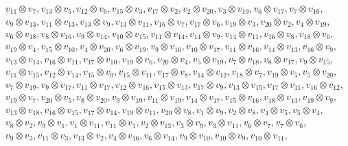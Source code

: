\documentclass[pdftex]{sigma}
\numberwithin{equation}{section}
\theoremstyle{definition}
\begin{document}
\begin{align*}
&v_{11} \otimes v_{7},
v_{13} \otimes v_{5},
v_{12} \otimes v_{6},
v_{15} \otimes v_{3},
v_{17} \otimes v_{2},
v_{2} \otimes v_{20},
v_{3} \otimes v_{19},
v_{6} \otimes v_{17},
v_{7} \otimes v_{16}, \\
&v_{9} \otimes v_{13},
v_{11} \otimes v_{13},
v_{13} \otimes v_{9},
v_{13} \otimes v_{11},
v_{16} \otimes v_{7},
v_{17} \otimes v_{6},
v_{19} \otimes v_{3},
v_{20} \otimes v_{2},
v_{4} \otimes v_{19}, \\
&v_{6} \otimes v_{18},
v_{8} \otimes v_{16},
v_{9} \otimes v_{14},
v_{10} \otimes v_{15},
v_{11} \otimes v_{14},
v_{14} \otimes v_{9},
v_{14} \otimes v_{11},
v_{16} \otimes v_{8},
v_{18} \otimes v_{6}, \\
&v_{19} \otimes v_{4},
v_{15} \otimes v_{10},
v_{4} \otimes v_{20},
v_{6} \otimes v_{19},
v_{9} \otimes v_{16},
v_{10} \otimes v_{17},
v_{11} \otimes v_{16},
v_{14} \otimes v_{13},
v_{16} \otimes v_{9}, \\
&v_{13} \otimes v_{14},
v_{16} \otimes v_{11},
v_{17} \otimes v_{10},
v_{19} \otimes v_{6},
v_{20} \otimes v_{4},
v_{5} \otimes v_{19},
v_{7} \otimes v_{18},
v_{8} \otimes v_{17},
v_{9} \otimes v_{15}, \\
&v_{11} \otimes v_{15},
v_{12} \otimes v_{14},
v_{15} \otimes v_{9},
v_{15} \otimes v_{11},
v_{17} \otimes v_{8},
v_{14} \otimes v_{12},
v_{18} \otimes v_{7},
v_{19} \otimes v_{5},
v_{5} \otimes v_{20}, \\
&v_{7} \otimes v_{19},
v_{9} \otimes v_{17},
v_{11} \otimes v_{17},
v_{12} \otimes v_{16},
v_{15} \otimes v_{13},
v_{17} \otimes v_{9},
v_{13} \otimes v_{15},
v_{17} \otimes v_{11},
v_{16} \otimes v_{12}, \\
&v_{19} \otimes v_{7},
v_{20} \otimes v_{5},
v_{8} \otimes v_{20},
v_{9} \otimes v_{19},
v_{11} \otimes v_{19},
v_{14} \otimes v_{17},
v_{15} \otimes v_{16},
v_{18} \otimes v_{13},
v_{19} \otimes v_{9}, \\
&v_{13} \otimes v_{18},
v_{16} \otimes v_{15},
v_{17} \otimes v_{14},
v_{19} \otimes v_{11},
v_{20} \otimes v_{8},
v_{1} \otimes v_{9},
v_{2} \otimes v_{8},
v_{4} \otimes v_{5},
v_{5} \otimes v_{4}, \\
&v_{8} \otimes v_{2},
v_{9} \otimes v_{1},
v_{1} \otimes v_{11},
v_{11} \otimes v_{1},
v_{2} \otimes v_{13},
v_{3} \otimes v_{9},
v_{3} \otimes v_{11},
v_{6} \otimes v_{7},
v_{7} \otimes v_{6}, \\
&v_{9} \otimes v_{3},
v_{11} \otimes v_{3},
v_{13} \otimes v_{2},
v_{4} \otimes v_{16},
v_{6} \otimes v_{14},
v_{9} \otimes v_{10},
v_{10} \otimes v_{9},
v_{10} \otimes v_{11},

\end{align*}
\end{document}
